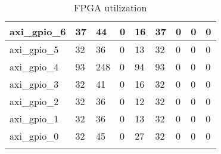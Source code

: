 \begin{landscape}
\begin{longtable}{@{}|l|l|l|l|l|l|l|l|l|@{}}
\rowcolor[HTML]{FFFFFF} 
axi\_gpio\_6 & 37 & 44 & 0 & 16 & 37 & 0 & 0 & 0 \\* \midrule
\rowcolor[HTML]{FFFFFF} 
axi\_gpio\_5 & 32 & 36 & 0 & 13 & 32 & 0 & 0 & 0 \\* \midrule
\rowcolor[HTML]{FFFFFF} 
axi\_gpio\_4 & 93 & 248 & 0 & 94 & 93 & 0 & 0 & 0 \\* \midrule
\rowcolor[HTML]{FFFFFF} 
axi\_gpio\_3 & 32 & 41 & 0 & 16 & 32 & 0 & 0 & 0 \\* \midrule
\rowcolor[HTML]{FFFFFF} 
axi\_gpio\_2 & 32 & 36 & 0 & 12 & 32 & 0 & 0 & 0 \\* \midrule
\rowcolor[HTML]{FFFFFF} 
axi\_gpio\_1 & 32 & 36 & 0 & 13 & 32 & 0 & 0 & 0 \\* \midrule
\rowcolor[HTML]{FFFFFF} 
axi\_gpio\_0 & 32 & 45 & 0 & 27 & 32 & 0 & 0 & 0 \\* \bottomrule
\caption{FPGA utilization}
\label{tab_FPGAUtilization}\\
\end{longtable}
\end{landscape}